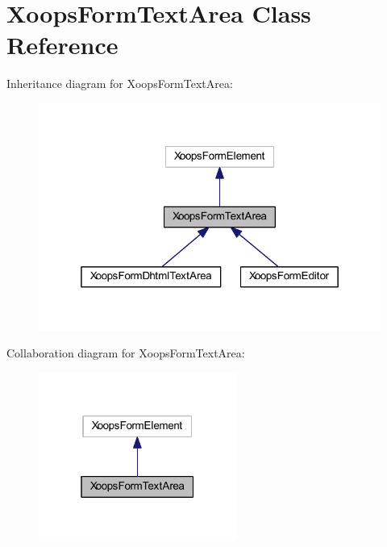 \hypertarget{class_xoops_form_text_area}{\section{Xoops\-Form\-Text\-Area Class Reference}
\label{class_xoops_form_text_area}
}


Inheritance diagram for Xoops\-Form\-Text\-Area\-:
\nopagebreak
\begin{figure}[H]
\begin{center}
\leavevmode
\includegraphics[width=319pt]{class_xoops_form_text_area__inherit__graph}
\end{center}
\end{figure}


Collaboration diagram for Xoops\-Form\-Text\-Area\-:
\nopagebreak
\begin{figure}[H]
\begin{center}
\leavevmode
\includegraphics[width=184pt]{class_xoops_form_text_area__coll__graph}
\end{center}
\end{figure}
